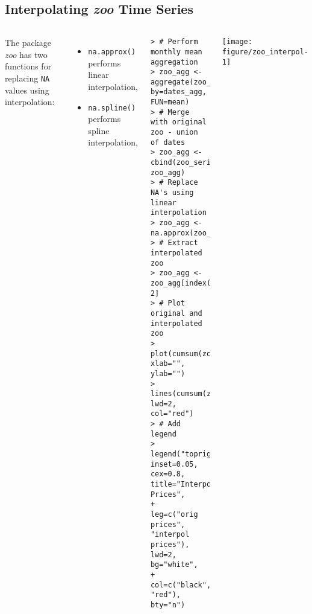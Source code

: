 \documentclass[10pt]{beamer}\usepackage[]{graphicx}\usepackage[]{color}
\makeatletter
\newenvironment{kframe}{%
 \def\at@end@of@kframe{}%
 \ifinner\ifhmode%
  \def\at@end@of@kframe{\end{minipage}}%
  \begin{minipage}{\columnwidth}%
 \fi\fi%
 \def\FrameCommand##1{\hskip\@totalleftmargin \hskip-\fboxsep
 \colorbox{shadecolor}{##1}\hskip-\fboxsep
     \hskip-\linewidth \hskip-\@totalleftmargin \hskip\columnwidth}%
 \MakeFramed {\advance\hsize-\width
   \@totalleftmargin\z@ \linewidth\hsize
   \@setminipage}}%
 {\par\unskip\endMakeFramed%
 \at@end@of@kframe}
\newenvironment{knitrout}{}{} %
\makeatother
\begin{document}
\subsection{Interpolating \protect\emph{zoo} Time Series}
\begin{frame}[fragile,t]{\subsecname}
\vspace{-1em}
\begin{block}{}
  \begin{columns}[T]
      The package \emph{zoo} has two functions for replacing \texttt{NA} values using interpolation:
      \begin{itemize}
        \item \texttt{na.approx()} performs linear interpolation,
        \item \texttt{na.spline()} performs spline interpolation,
      \end{itemize}
      \vspace{-1em}
\begin{knitrout}\tiny
{}\color{fgcolor}\begin{kframe}
\begin{verbatim}
> # Perform monthly mean aggregation
> zoo_agg <- aggregate(zoo_series, by=dates_agg, FUN=mean)
> # Merge with original zoo - union of dates
> zoo_agg <- cbind(zoo_series, zoo_agg)
> # Replace NA's using linear interpolation
> zoo_agg <- na.approx(zoo_agg)
> # Extract interpolated zoo
> zoo_agg <- zoo_agg[index(zoo_series), 2]
> # Plot original and interpolated zoo
> plot(cumsum(zoo_series), xlab="", ylab="")
> lines(cumsum(zoo_agg), lwd=2, col="red")
> # Add legend
> legend("topright", inset=0.05, cex=0.8, title="Interpolated Prices",
+  leg=c("orig prices", "interpol prices"), lwd=2, bg="white",
+  col=c("black", "red"), bty="n")
\end{verbatim}
\end{kframe}
\end{knitrout}
      \texttt{[image: figure/zoo\_interpol-1]}
  \end{columns}
\end{block}

\end{frame}


\end{document}
